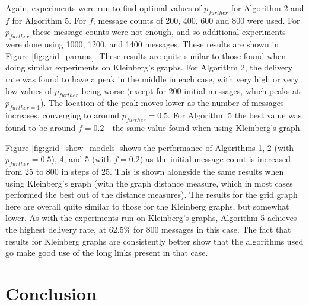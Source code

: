 \documentclass[bsc,frontabs,twoside,singlespacing,parskip,deptreport]{infthesis}     %
\begin{document}
Again, experiments were run to find optimal values of $p_{further}$ for Algorithm 2 and $f$ for Algorithm 5. For $f$, message counts of 200, 400, 600 and 800 were used. For $p_{further}$ these message counts were not enough, and so additional experiments were done using 1000, 1200, and 1400 messages. These results are shown in Figure \ref{fig:grid_params}. These results are quite similar to those found when doing similar experiments on Kleinberg's graphs. For Algorithm 2, the delivery rate was found to have a peak in the middle in each case, with very high or very low values of $p_{further}$ being worse (except for 200 initial messages, which peaks at $p_{further=1}$). The location of the peak moves lower as the number of messages increases, converging to around $p_{further}=0.5$. For Algorithm 5 the best value was found to be around $f=0.2$ - the same value found when using Kleinberg's graph.

Figure \ref{fig:grid_show_models} shows the performance of Algorithms 1, 2 (with $p_{further}=0.5$), 4, and 5 (with $f=0.2$) as the initial message count is increased from 25 to 800 in steps of 25. This is shown alongside the same results when using Kleinberg's graph (with the graph distance measure, which in most cases performed the best out of the distance measures). The results for the grid graph here are overall quite similar to those for the Kleinberg graphs, but somewhat lower. As with the experiments run on Kleinberg's graphs, Algorithm 5 achieves the highest delivery rate, at 62.5\% for 800 messages in this case. The fact that results for Kleinberg graphs are consistently better show that the algorithms used go make good use of the long links present in that case.


\chapter{Conclusion}



\end{document}
